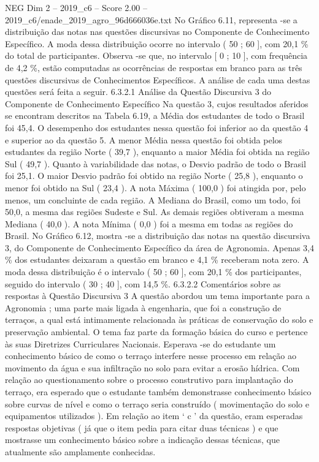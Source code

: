 \begin{textsample}{NEG Dim 2 – 2019\_c6 – Score 2.00 – 2019\_c6/enade\_2019\_agro\_96d666036e.txt}
No Gráfico 6.11, representa -se a distribuição das notas nas questões discursivas no Componente de Conhecimento Específico.
A moda dessa distribuição ocorre no intervalo ( 50 ; 60 ], com 20,1 \% do total de participantes.
Observa -se que, no intervalo [ 0 ; 10 ], com frequência de 4,2 \%, estão computadas as ocorrências de respostas em branco para as três questões discursivas de Conhecimentos Específicos.
A análise de cada uma destas questões será feita a seguir. 6.3.2.1 Análise da Questão Discursiva 3 do Componente de Conhecimento Específico Na questão 3, cujos resultados aferidos se encontram descritos na Tabela 6.19, a Média dos estudantes de todo o Brasil foi 45,4.
O desempenho dos estudantes nessa questão foi inferior ao da questão 4 e superior ao da questão 5.
A menor Média nessa questão foi obtida pelos estudantes da região Norte ( 39,7 ), enquanto a maior Média foi obtida na região Sul ( 49,7 ).
Quanto à variabilidade das notas, o Desvio padrão de todo o Brasil foi 25,1.
O maior Desvio padrão foi obtido na região Norte ( 25,8 ), enquanto o menor foi obtido na Sul ( 23,4 ).
A nota Máxima ( 100,0 ) foi atingida por, pelo menos, um concluinte de cada região.
A Mediana do Brasil, como um todo, foi 50,0, a mesma das regiões Sudeste e Sul.
As demais regiões obtiveram a mesma Mediana ( 40,0 ).
A nota Mínima ( 0,0 ) foi a mesma em todas as regiões do Brasil.
No Gráfico 6.12, mostra -se a distribuição das notas na questão discursiva 3, do Componente de Conhecimento Específico da área de Agronomia.
Apenas 3,4 \% dos estudantes deixaram a questão em branco e 4,1 \% receberam nota zero.
A moda dessa distribuição é o intervalo ( 50 ; 60 ], com 20,1 \% dos participantes, seguido do intervalo ( 30 ; 40 ], com 14,5 \%. 6.3.2.2 Comentários sobre as respostas à Questão Discursiva 3 A questão abordou um tema importante para a Agronomia ; uma parte mais ligada à engenharia, que foi a construção de terraços, a qual está intimamente relacionada às práticas de conservação do solo e preservação ambiental.
O tema faz parte da formação básica do curso e pertence às suas Diretrizes Curriculares Nacionais.
Esperava -se do estudante um conhecimento básico de como o terraço interfere nesse processo em relação ao movimento da água e sua infiltração no solo para evitar a erosão hídrica.
Com relação ao questionamento sobre o processo construtivo para implantação do terraço, era esperado que o estudante também demonstrasse conhecimento básico sobre curvas de nível e como o terraço seria construído ( movimentação do solo e equipamentos utilizados ).
Em relação ao item ‘ c ’ da questão, eram esperadas respostas objetivas ( já que o item pedia para citar duas técnicas ) e que mostrasse um conhecimento básico sobre a indicação dessas técnicas, que atualmente são amplamente conhecidas.

\end{textsample}
